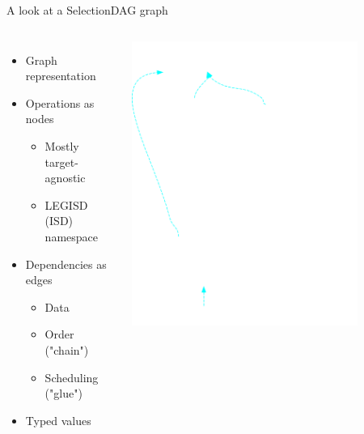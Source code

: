 \begin{frame}{A look at a SelectionDAG graph}

\begin{columns}[t]
    \begin{itemize}
        \item Graph representation
        \item Operations as nodes
        \begin{itemize}
            \item Mostly target-agnostic
            \item LEGISD (ISD) namespace
        \end{itemize}
        \item Dependencies as edges
        \begin{itemize}
            \item Data
            \item Order ("chain")
            \item Scheduling ("glue")
        \end{itemize}
        \item Typed values
    \end{itemize}
    \begin{block}{}
        \includegraphics[width = 0.8\textwidth]{examples/ex1-entry-selection-dag.png}
    \end{block}
\end{columns}

\end{frame}

